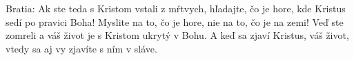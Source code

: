 Bratia: Ak ste teda s Kristom vstali z mŕtvych, hľadajte, čo je hore, kde Kristus sedí po pravici Boha! 
Myslite na to, čo je hore, nie na to, čo je na zemi! 
Veď ste zomreli a váš život je s Kristom ukrytý v Bohu. 
A keď sa zjaví Kristus, váš život, vtedy sa aj vy zjavíte s ním v sláve.